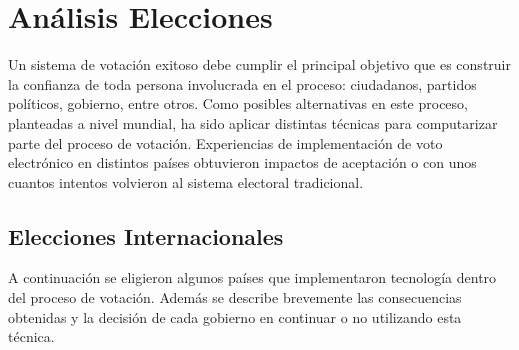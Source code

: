 \chapter{Análisis Elecciones}
\label{Elecciones}

Un sistema de votación exitoso debe cumplir el principal objetivo que es construir la confianza de toda persona involucrada en el proceso: ciudadanos, partidos políticos, gobierno, entre otros. Como posibles alternativas en este proceso, planteadas a nivel mundial, ha sido aplicar distintas técnicas para computarizar parte del proceso de votación. 
Experiencias de implementación de voto electrónico en distintos países obtuvieron impactos de aceptación o con unos cuantos intentos volvieron al sistema electoral tradicional.

\section{Elecciones Internacionales}
A continuación se eligieron algunos países que implementaron tecnología dentro del proceso de votación. Además se describe brevemente las consecuencias obtenidas y la decisión de cada gobierno en continuar o no utilizando esta técnica.

